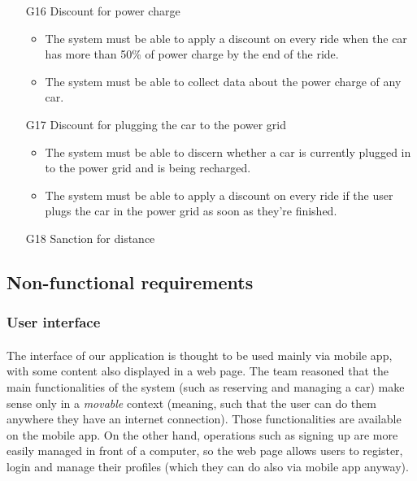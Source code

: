 \begin{itemize}
	\item [G16] Discount for power charge %
		\begin{itemize}
			\item The system must be able to apply a discount on every ride when the car has more than 50\% of power charge by the end of the ride. %
			\item The system must be able to collect data about the power charge of any car.
		\end{itemize}
	\item [G17] Discount for plugging the car to the power grid %
		\begin{itemize}
			\item The system must be able to discern whether a car is currently plugged in to the power grid and is being recharged.
			\item The system must be able to apply a discount on every ride if the user plugs the car in the power grid as soon as they're finished. %
		\end{itemize}
	\item [G18] Sanction for distance %
\end{itemize}



\subsection{Non-functional requirements}
	\subsubsection{User interface}
	\paragraph{}The interface of our application is thought to be used mainly via mobile app, with some content also displayed in a web page. The team reasoned that the main functionalities of the system (such as reserving and managing a car) make sense only in a \textit{movable} context (meaning, such that the user can do them anywhere they have an internet connection). Those functionalities are available on the mobile app. On the other hand, operations such as signing up are more easily managed in front of a computer, so the web page allows users to register, login and manage their profiles (which they can do also via mobile app anyway).
